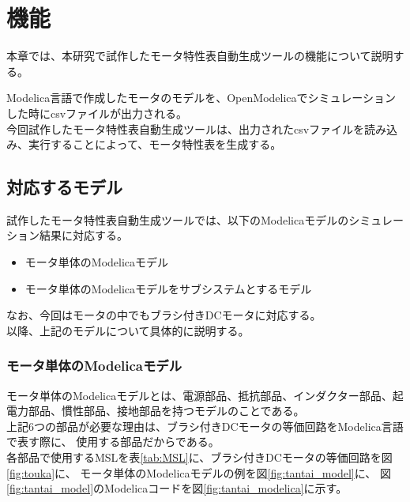 \chapter{機能}\label{cha:Function}

本章では、本研究で試作したモータ特性表自動生成ツールの機能について説明する。

Modelica言語で作成したモータのモデルを、OpenModelicaでシミュレーションした時にcsvファイルが出力される。\\
今回試作したモータ特性表自動生成ツールは、出力されたcsvファイルを読み込み、実行することによって、モータ特性表を生成する。\\

\section{対応するモデル}\label{taioumodel}
試作したモータ特性表自動生成ツールでは、以下のModelicaモデルのシミュレーション結果に対応する。
\begin{itemize}
	\item モータ単体のModelicaモデル
	\item モータ単体のModelicaモデルをサブシステムとするモデル
\end{itemize}
なお、今回はモータの中でもブラシ付きDCモータに対応する。\\
以降、上記のモデルについて具体的に説明する。

\subsection{モータ単体のModelicaモデル}\label{sec:sub1}
モータ単体のModelicaモデルとは、電源部品、抵抗部品、インダクター部品、起電力部品、慣性部品、接地部品を持つモデルのことである。\\
上記6つの部品が必要な理由は、ブラシ付きDCモータの等価回路\cite{等価回路}をModelica言語で表す際に、
使用する部品\cite{modelicaシステム本}だからである。\\
各部品で使用するMSLを表\ref{tab:MSL}に、ブラシ付きDCモータの等価回路を図\ref{fig:touka}に、
モータ単体のModelicaモデルの例を図\ref{fig:tantai_model}に、
図\ref{fig:tantai_model}のModelicaコードを図\ref{fig:tantai_modelica}に示す。

